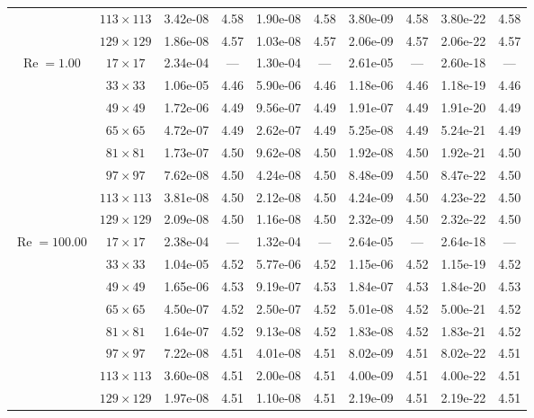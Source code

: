 \documentclass[preprint, 12pt]{elsarticle}
\begin{document}
\begin{center}
\begin{table}[H]
{\begin{tabular*}{\textwidth}{@{\extracolsep\fill}cccccccccc@{}}
    & $113\times 113$ & 3.42e-08 & 4.58 & 1.90e-08 & 4.58 & 3.80e-09 & 4.58 & 3.80e-22 & 4.58 \\
    & $129\times 129$ & 1.86e-08 & 4.57 & 1.03e-08 & 4.57 & 2.06e-09 & 4.57 & 2.06e-22 & 4.57 \\
    \hline\hline
    \multirow{7}{*}{$\operatorname{Re}=1.00$} & $17\times 17$ & 2.34e-04 & --- & 1.30e-04 & --- & 2.61e-05 & --- & 2.60e-18 & --- \\
    & $33\times 33$ & 1.06e-05 & 4.46 & 5.90e-06 & 4.46 & 1.18e-06 & 4.46 & 1.18e-19 & 4.46 \\
    & $49\times 49$ & 1.72e-06 & 4.49 & 9.56e-07 & 4.49 & 1.91e-07 & 4.49 & 1.91e-20 & 4.49 \\
    \multirow{3}{*}{$\operatorname{Wi}=10$} & $65\times 65$ & 4.72e-07 & 4.49 & 2.62e-07 & 4.49 & 5.25e-08 & 4.49 & 5.24e-21 & 4.49 \\
    & $81\times 81$ & 1.73e-07 & 4.50 & 9.62e-08 & 4.50 & 1.92e-08 & 4.50 & 1.92e-21 & 4.50 \\
    & $97\times 97$ & 7.62e-08 & 4.50 & 4.24e-08 & 4.50 & 8.48e-09 & 4.50 & 8.47e-22 & 4.50 \\
    & $113\times 113$ & 3.81e-08 & 4.50 & 2.12e-08 & 4.50 & 4.24e-09 & 4.50 & 4.23e-22 & 4.50 \\
    & $129\times 129$ & 2.09e-08 & 4.50 & 1.16e-08 & 4.50 & 2.32e-09 & 4.50 & 2.32e-22 & 4.50 \\
    \hline
    \multirow{7}{*}{$\operatorname{Re}=100.00$} & $17\times 17$ & 2.38e-04 & --- & 1.32e-04 & --- & 2.64e-05 & --- & 2.64e-18 & --- \\
    & $33\times 33$ & 1.04e-05 & 4.52 & 5.77e-06 & 4.52 & 1.15e-06 & 4.52 & 1.15e-19 & 4.52 \\
    & $49\times 49$ & 1.65e-06 & 4.53 & 9.19e-07 & 4.53 & 1.84e-07 & 4.53 & 1.84e-20 & 4.53 \\
    \multirow{3}{*}{$\operatorname{Wi}=10$} & $65\times 65$ & 4.50e-07 & 4.52 & 2.50e-07 & 4.52 & 5.01e-08 & 4.52 & 5.00e-21 & 4.52 \\
    & $81\times 81$ & 1.64e-07 & 4.52 & 9.13e-08 & 4.52 & 1.83e-08 & 4.52 & 1.83e-21 & 4.52 \\
    & $97\times 97$ & 7.22e-08 & 4.51 & 4.01e-08 & 4.51 & 8.02e-09 & 4.51 & 8.02e-22 & 4.51 \\
    & $113\times 113$ & 3.60e-08 & 4.51 & 2.00e-08 & 4.51 & 4.00e-09 & 4.51 & 4.00e-22 & 4.51 \\
    & $129\times 129$ & 1.97e-08 & 4.51 & 1.10e-08 & 4.51 & 2.19e-09 & 4.51 & 2.19e-22 & 4.51 \\

\end{tabular*}}
\end{table}
\end{center}
\end{document}
